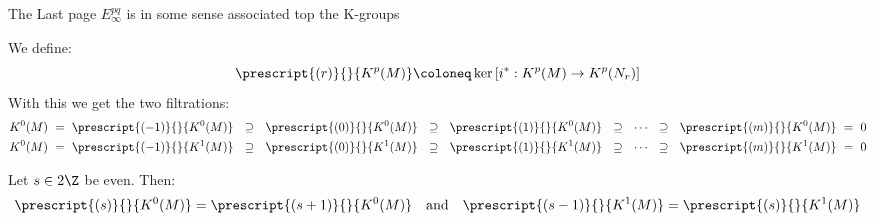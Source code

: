 	\begin{theorem}
		The Last page $E^{pq}_{\infty}$ is in some sense associated top the K-groups
	\end{theorem}
	\begin{definition}
		We define:
		\begin{equation*}
			\prescript{(r)}{}{K^p(M)}\coloneq \ker\left[i^*: K^p(M)\to K^p(N_r)\right]
		\end{equation*} With this we get the two filtrations:
		\begin{align*}
			&K^0(M)~=~	\prescript{(-1)}{}{K^0(M)} ~~\supseteq ~~\prescript{(0)}{}{K^0(M)}~~\supseteq~~ \prescript{(1)}{}{K^0(M)}~~\supseteq ~~\cdots~~ \supseteq ~~ \prescript{(m)}{}{K^0(M)}~=~0 \\
			&K^0(M)~=~	\prescript{(-1)}{}{K^1(M)} ~~\supseteq ~~\prescript{(0)}{}{K^1(M)}~~\supseteq~~ \prescript{(1)}{}{K^1(M)}~~\supseteq ~~\cdots~~ \supseteq ~~\prescript{(m)}{}{K^1(M)}~=~0
		\end{align*}
	\end{definition}
	\begin{lemma}
		Let $s\in 2\Z$ be even. Then:
		\begin{equation*}
			\prescript{(s)}{}{K^0(M)}=\prescript{(s+1)}{}{K^0(M)}\quad \text{and}\quad 	\prescript{(s-1)}{}{K^1(M)}=\prescript{(s)}{}{K^1(M)}
		\end{equation*}
	\end{lemma}
